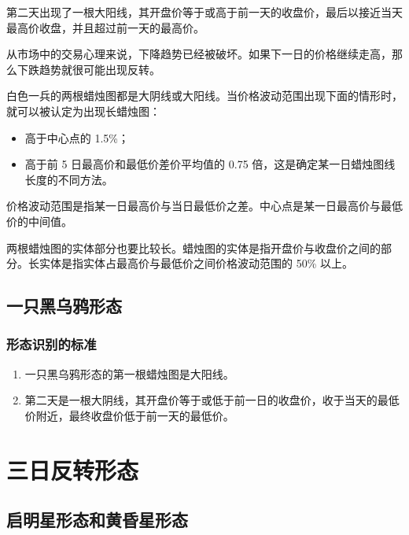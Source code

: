第二天出现了一根大阳线，其开盘价等于或高于前一天的收盘价，最后以接近当天最高价收盘，并且超过前一天的最高价。

从市场中的交易心理来说，下降趋势已经被破坏。如果下一日的价格继续走高，那么下跌趋势就很可能出现反转。

白色一兵的两根蜡烛图都是大阴线或大阳线。当价格波动范围出现下面的情形时，就可以被认定为出现长蜡烛图：
\begin{itemize}
    \item 高于中心点的 1.5\%；
    \item 高于前 5 日最高价和最低价差价平均值的 0.75 倍，这是确定某一日蜡烛图线长度的不同方法。
\end{itemize}
价格波动范围是指某一日最高价与当日最低价之差。中心点是某一日最高价与最低价的中间值。

两根蜡烛图的实体部分也要比较长。蜡烛图的实体是指开盘价与收盘价之间的部分。长实体是指实体占最高价与最低价之间价格波动范围的 50\% 以上。
\subsection{一只黑乌鸦形态}
\subsubsection*{形态识别的标准}
\begin{enumerate}
    \item 一只黑乌鸦形态的第一根蜡烛图是大阳线。
    \item 第二天是一根大阴线，其开盘价等于或低于前一日的收盘价，收于当天的最低价附近，最终收盘价低于前一天的最低价。
\end{enumerate}
\section{三日反转形态}
\subsection{启明星形态和黄昏星形态}

